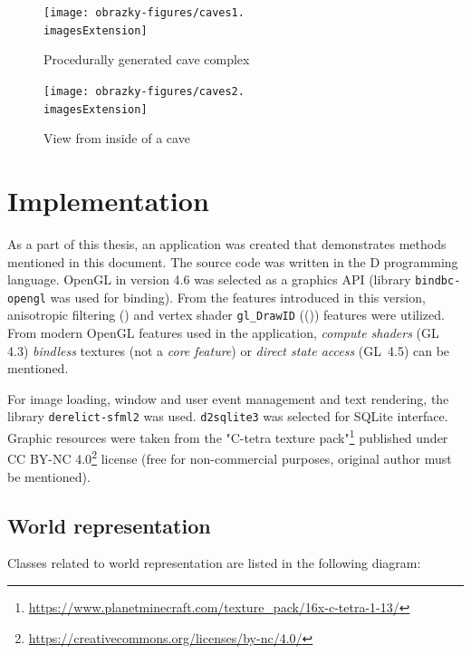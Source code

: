 \begin{figure}[H]
	\texttt{[image: obrazky-figures/caves1.\\imagesExtension]}
	\caption{Procedurally generated cave complex}
\end{figure}

\vfill

\begin{figure}[H]
	\texttt{[image: obrazky-figures/caves2.\\imagesExtension]}
	\caption{View from inside of a cave}
\end{figure}

\chapter{Implementation} \label{ch:impl}
As a part of this thesis, an application was created that demonstrates methods mentioned in this document. The source code was written in the D programming language. OpenGL in version 4.6 was selected as a graphics API (library \texttt{bindbc-opengl} was used for binding). From the features introduced in this version, anisotropic filtering () and vertex shader \verb|gl_DrawID| (()) features were utilized. From modern OpenGL features used in the application, \textit{compute shaders} (GL 4.3) \textit{bindless} textures (not a \textit{core feature}) or \textit{direct state access} (GL~4.5) can be mentioned.

For image loading, window and user event management and text rendering, the library \texttt{derelict-sfml2} was used. \texttt{d2sqlite3} was selected for SQLite interface. Graphic resources were taken from the "C-tetra texture pack"\footnote{\url{https://www.planetminecraft.com/texture_pack/16x-c-tetra-1-13/}} published under CC BY-NC 4.0\footnote{\url{https://creativecommons.org/licenses/by-nc/4.0/}} license (free for non-commercial purposes, original author must be mentioned).

\section{World representation}
Classes related to world representation are listed in the following diagram:

